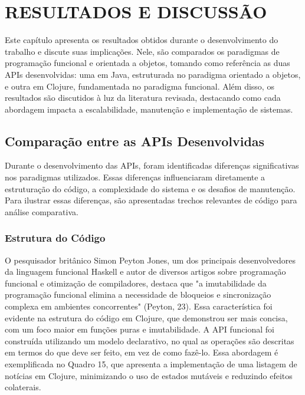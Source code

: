 \chapter{RESULTADOS E DISCUSSÃO}

Este capítulo apresenta os resultados obtidos durante o desenvolvimento do trabalho e discute suas implicações. Nele, são comparados os paradigmas de programação funcional e orientada a objetos, tomando como referência as duas APIs desenvolvidas: uma em Java, estruturada no paradigma orientado a objetos, e outra em Clojure, fundamentada no paradigma funcional. Além disso, os resultados são discutidos à luz da literatura revisada, destacando como cada abordagem impacta a escalabilidade, manutenção e implementação de sistemas.

\section{Comparação entre as APIs Desenvolvidas}

Durante o desenvolvimento das APIs, foram identificadas diferenças significativas nos paradigmas utilizados. Essas diferenças influenciaram diretamente a estruturação do código, a complexidade do sistema e os desafios de manutenção. Para ilustrar essas diferenças, são apresentadas trechos relevantes de código para análise comparativa.

\subsection{Estrutura do Código}

O pesquisador britânico Simon Peyton Jones, um dos principais desenvolvedores da linguagem funcional Haskell e autor de diversos artigos sobre programação funcional e otimização de compiladores, destaca que "a imutabilidade da programação funcional elimina a necessidade de bloqueios e sincronização complexa em ambientes concorrentes" (Peyton, 23).
Essa característica foi evidente na estrutura do código em Clojure, que demonstrou ser mais concisa, com um foco maior em funções puras e imutabilidade. A API funcional foi construída utilizando um modelo declarativo, no qual as operações são descritas em termos do que deve ser feito, em vez de como fazê-lo.
Essa abordagem é exemplificada no Quadro 15, que apresenta a implementação de uma listagem de notícias em Clojure, minimizando o uso de estados mutáveis e reduzindo efeitos colaterais.



